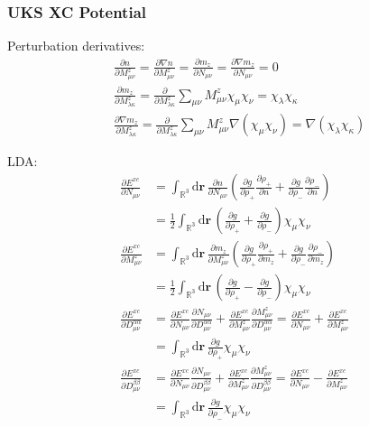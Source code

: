 \documentclass[11pt]{article}
\newcommand{\dd}[1]{\mathrm{d}{#1}\,}
\begin{document}
\subsubsection{UKS XC Potential}
Perturbation derivatives:
\begin{align}
&\frac{\partial n}{\partial M^z_{\mu\nu}} = \frac{\partial \nabla n}{\partial M^z_{\mu\nu}} 
 = \frac{\partial m_z}{\partial N_{\mu\nu}} = \frac{\partial \nabla m_z}{\partial N_{\mu\nu}} = 0 \\
&\frac{\partial m_z}{\partial M^z_{\lambda\kappa}} = \frac{\partial}{\partial M^z_{\lambda\kappa}} \sum_{\mu\nu} M^z_{\mu\nu} \chi_\mu \chi_\nu
  = \chi_\lambda \chi_\kappa \\ 
&\frac{\partial \nabla m_z}{\partial M^z_{\lambda\kappa}} = \frac{\partial}{\partial M^z_{\lambda\kappa}} \sum_{\mu\nu} M^z_{\mu\nu} \nabla(\chi_\mu \chi_\nu)
  = \nabla(\chi_\lambda \chi_\kappa) 
\end{align}

LDA:
\begin{align}
\frac{\partial E^{xc}}{\partial N_{\mu\nu}} &= \int_{\mathbb{R}^3} \dd{\mathbf{r}} 
  \frac{\partial n}{\partial N_{\mu\nu}}\left( \frac{\partial g}{\partial \rho_+}\frac{\partial\rho_+}{\partial n} +
    \frac{\partial g}{\partial \rho_-}\frac{\partial\rho_-}{\partial n} \right) \nonumber \\
  &= \frac{1}{2}\int_{\mathbb{R}^3} \dd{\mathbf{r}} \left(\frac{\partial g}{\partial \rho_+} + \frac{\partial g}{\partial \rho_-} \right) \chi_\mu \chi_\nu \\
\frac{\partial E^{xc}}{\partial M^z_{\mu\nu}} &= \int_{\mathbb{R}^3} \dd{\mathbf{r}} 
  \frac{\partial m_z}{\partial M^z_{\mu\nu}}\left( \frac{\partial g}{\partial \rho_+}\frac{\partial\rho_+}{\partial m_z} +
    \frac{\partial g}{\partial \rho_-}\frac{\partial\rho_-}{\partial m_z} \right) \nonumber \\
  &= \frac{1}{2}\int_{\mathbb{R}^3} \dd{\mathbf{r}} \left(\frac{\partial g}{\partial \rho_+} - \frac{\partial g}{\partial \rho_-} \right) \chi_\mu \chi_\nu \\
\frac{\partial E^{xc}}{\partial D^{\alpha\alpha}_{\mu\nu}} &= 
  \frac{\partial E^{xc}}{\partial N_{\mu\nu}} \frac{\partial N_{\mu\nu}}{\partial D^{\alpha\alpha}_{\mu\nu}} +
  \frac{\partial E^{xc}}{\partial M^z_{\mu\nu}} \frac{\partial M^z_{\mu\nu}}{\partial D^{\alpha\alpha}_{\mu\nu}} = 
  \frac{\partial E^{xc}}{\partial N_{\mu\nu}} + \frac{\partial E^{xc}}{\partial M^z_{\mu\nu}}  \nonumber \\
  &= \int_{\mathbb{R}^3} \dd{\mathbf{r}} \frac{\partial g}{\partial \rho_+} \chi_\mu \chi_\nu \\
\frac{\partial E^{xc}}{\partial D^{\beta\beta}_{\mu\nu}} &= 
  \frac{\partial E^{xc}}{\partial N_{\mu\nu}} \frac{\partial N_{\mu\nu}}{\partial D^{\beta\beta}_{\mu\nu}} +
  \frac{\partial E^{xc}}{\partial M^z_{\mu\nu}} \frac{\partial M^z_{\mu\nu}}{\partial D^{\beta\beta}_{\mu\nu}} = 
  \frac{\partial E^{xc}}{\partial N_{\mu\nu}} - \frac{\partial E^{xc}}{\partial M^z_{\mu\nu}}  \nonumber \\
  &= \int_{\mathbb{R}^3} \dd{\mathbf{r}} \frac{\partial g}{\partial \rho_-} \chi_\mu \chi_\nu 
\end{align}
\end{document}
